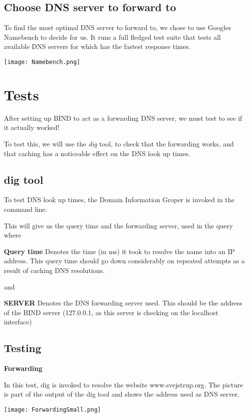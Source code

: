 \subsection{Choose DNS server to forward to}
To find the most optimal DNS server to forward to, we chose to use Googles Namebench to decide for us. It runs a full fledged test suite that tests all available DNS servers for which has the fastest response times.  

\begin{center}
	\texttt{[image: Namebench.png]}
\end{center}



\section{Tests}
After setting up BIND to act as a forwarding DNS server, we must test to see if it actually worked!

To test this, we will use the \textit{dig} tool, to check that the forwarding works, and that caching has a noticeable effect on the DNS look up times. 
\subsection{dig tool}
To test DNS look up times, the Domain Information Groper is invoked in the command line.

This will give us the query time and the forwarding server, used in the query where

\textbf{Query time}
Denotes the time (in ms) it took to resolve the name into an IP address.
This query time should go down considerably on repeated attempts as a result of caching DNS resolutions.

and

\textbf{SERVER}
Denotes the DNS forwarding server used. This should be the address of the BIND server (127.0.0.1, as this server is checking on the localhost interface)

\subsection{Testing}
\textbf{Forwarding}

In this test, dig is invoked to resolve the website www.svejstrup.org. 
The picture is part of the output of the dig tool and shows the address used as DNS server.

\begin{center}
	\texttt{[image: ForwardingSmall.png]}
\end{center}

